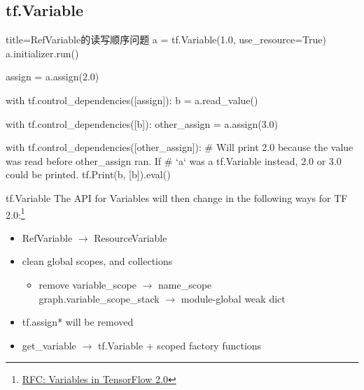 
\subsection{tf.Variable}

\begin{frame}[fragile]
    \begin{tcblisting}{title=RefVariable的读写顺序问题}
        a = tf.Variable(1.0, use_resource=True)
        a.initializer.run()

        assign = a.assign(2.0)

        with tf.control_dependencies([assign]):
          b = a.read_value()

        with tf.control_dependencies([b]):
          other_assign = a.assign(3.0)

        with tf.control_dependencies([other_assign]):
          # Will print 2.0 because the value was read before other_assign ran. If
          # `a` was a tf.Variable instead, 2.0 or 3.0 could be printed.
          tf.Print(b, [b]).eval()
    \end{tcblisting}
\end{frame}

\begin{frame}{tf.Variable}
    The API for Variables will then change in the following ways for TF 2.0:\footnote{\href{https://github.com/tensorflow/community/pull/11}{RFC: Variables in TensorFlow 2.0}}

    \begin{itemize}
        \item RefVariable $\to$ ResourceVariable
        \item clean global scopes, and collections
            \begin{itemize}
                \item remove variable\_scope $\to$ name\_scope \\
                      graph.variable\_scope\_stack $\to$ module-global weak dict
            \end{itemize}
        \item tf.assign* will be removed
        \item get\_variable  $\to$ tf.Variable + scoped factory functions
    \end{itemize}
\end{frame}

